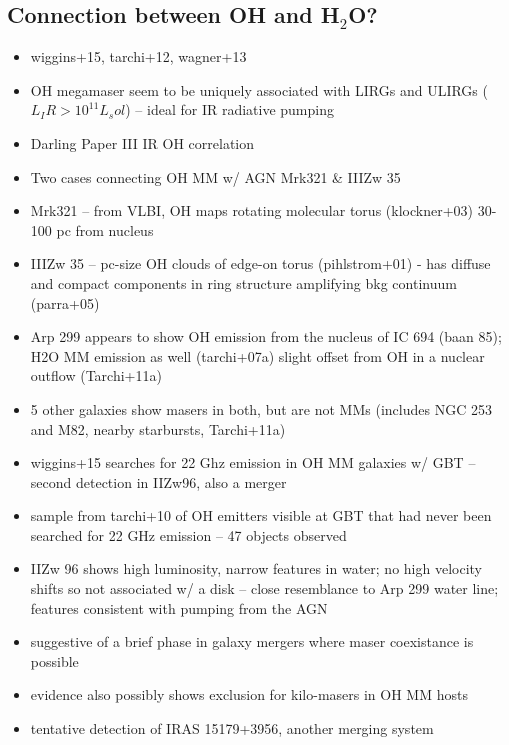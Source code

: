 \subsection{Connection between OH and H$_2$O?}
\label{sec:oh_and_h2o}

\begin{itemize}
\item wiggins+15, tarchi+12, wagner+13
\item OH megamaser seem to be uniquely associated with LIRGs and ULIRGs ($L_IR>10^11 L_sol$) -- ideal for IR radiative pumping 
\item Darling Paper III IR OH correlation
\item Two cases connecting OH MM w/ AGN Mrk321 \& IIIZw 35
\item Mrk321 -- from VLBI, OH maps rotating molecular torus (klockner+03) 30-100 pc from nucleus
\item IIIZw 35 -- pc-size OH clouds of edge-on torus (pihlstrom+01) - has diffuse and compact components in ring structure amplifying bkg continuum (parra+05)
\item Arp 299 appears to show OH emission from the nucleus of IC 694 (baan 85); H2O MM emission as well (tarchi+07a) slight offset from OH in a nuclear outflow (Tarchi+11a)
\item 5 other galaxies show masers in both, but are not MMs (includes NGC 253 and M82, nearby starbursts, Tarchi+11a)
\item wiggins+15 searches for 22 Ghz emission in OH MM galaxies w/ GBT -- second detection in IIZw96, also a merger
\item sample from tarchi+10 of OH emitters visible at GBT that had never been searched for 22 GHz emission -- 47 objects observed
\item IIZw 96 shows high luminosity, narrow features in water; no high velocity shifts so not associated w/ a disk -- close resemblance to Arp 299 water line; features consistent with pumping from the AGN
\item suggestive of a brief phase in galaxy mergers where maser coexistance is possible
\item evidence also possibly shows exclusion for kilo-masers in OH MM hosts
\item tentative detection of IRAS 15179+3956, another merging system
\end{itemize}